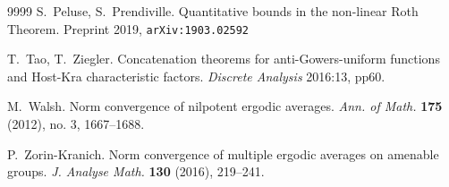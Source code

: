 \documentclass[11pt]{amsart}
\theoremstyle{definition}
\begin{document}
\begin{thebibliography}{9999}
	 S.~Peluse, S.~Prendiville. Quantitative bounds in the non-linear Roth Theorem. Preprint 2019,  \texttt{arXiv:1903.02592}
	
	

	 T.~Tao, T.~Ziegler.
	Concatenation theorems for anti-Gowers-uniform functions and Host-Kra characteristic factors.
	{\em Discrete Analysis} 2016:13, pp60.
	
	M.~Walsh. Norm convergence of nilpotent ergodic averages. {\em Ann. of Math.} {\bf 175} (2012), no. 3, 1667--1688.
	
	
	
	P.~Zorin-Kranich. Norm convergence of multiple ergodic averages on amenable groups.
	 {\em J. Analyse Math.} {\bf  130} (2016), 219--241.
	
	
\end{thebibliography}
\end{document}
